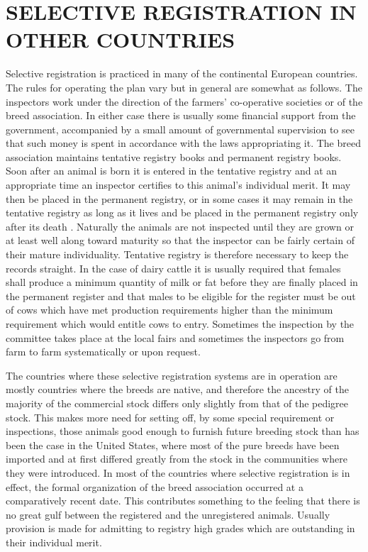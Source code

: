 \section*{SELECTIVE REGISTRATION IN OTHER COUNTRIES}

Selective registration is practiced in many of the continental European
countries. The rules for operating the plan vary but in general are
somewhat as follows. The inspectors work under the direction of the
farmers' co-operative societies or of the breed association. In either case
there is usually some financial support from the government, accompanied
by a small amount of governmental supervision to see that such
money is spent in accordance with the laws appropriating it. The breed
association maintains tentative registry books and permanent registry
books. Soon after an animal is born it is entered in the tentative registry
and at an appropriate time an inspector certifies to this animal's individual
merit. It may then be placed in the permanent registry, or in
some cases it may remain in the tentative registry as long as it lives and
be placed in the permanent registry only after its death . Naturally the
animals are not inspected until they are grown or at least well along
toward maturity so that the inspector can be fairly certain of their
mature individuality. Tentative registry is therefore necessary to keep
the records straight. In the case of dairy cattle it is usually required that
females shall produce a minimum quantity of milk or fat before they
are finally placed in the permanent register and that males to be eligible
for the register must be out of cows which have met production
requirements higher than the minimum requirement which would
entitle cows to entry. Sometimes the inspection by the committee takes
place at the local fairs and sometimes the inspectors go from farm to
farm systematically or upon request.

The countries where these selective registration systems are in operation
are mostly countries where the breeds are native, and therefore the
ancestry of the majority of the commercial stock differs only slightly
from that of the pedigree stock. This makes more need for setting off,
by some special requirement or inspections, those animals good enough
to furnish future breeding stock than has been the case in the United
States, where most of the pure breeds have been imported and at first
differed greatly from the stock in the communities where they were
introduced. In most of the countries where selective registration is in
effect, the formal organization of the breed association occurred at a
comparatively recent date. This contributes something to the feeling
that there is no great gulf between the registered and the unregistered
animals. Usually provision is made for admitting to registry high grades
which are outstanding in their individual merit.
\nowidow

